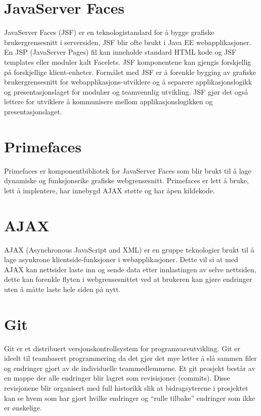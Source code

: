 \documentclass[../main.tex]{subfiles}
\begin{document}
\section{JavaServer Faces}
JavaServer Faces (JSF) er en teknologistandard for å bygge grafiske brukergrensesnitt i serversiden, JSF blir ofte brukt i Java EE webapplikasjoner. En JSP (JavaServer Pages) fil kan inneholde standard HTML kode og JSF templates eller moduler kalt Facelets. JSF komponentene kan gjengis forskjellig på forskjellige klient-enheter. Formålet med JSF er å forenkle bygging av grafiske brukergrensesnitt for webapplikasjons-utviklere og å separere applikasjonslogikk og presentasjonslaget for modulær og teamvennlig utvikling. JSF gjør det også lettere for utviklere å kommunisere mellom applikasjonslogikken og presentasjonslaget. 

\section{Primefaces}
Primefaces er komponentbibliotek for JavaServer Faces som blir brukt til å lage dynamiske og funksjonsrike grafiske webgrensesnitt. Primefaces er lett å bruke, lett å implentere, har innebygd AJAX støtte og har åpen kildekode.

\section{AJAX}
AJAX (Asynchronous JavaScript and XML) er en gruppe teknologier brukt til å lage asynkrone klientside-funksjoner i webapplikasjoner. Dette vil si at med AJAX kan nettsider laste inn og sende data etter innlastingen av selve nettsiden, dette kan forenkle flyten i webgrensesnittet ved at brukeren kan gjøre endringer uten å måtte laste hele siden på nytt. 

\section{Git}
Git er et distribuert versjonskontrollsystem for programvareutvikling. Git er ideelt til teambasert programmering da det gjør det mye letter å slå sammen filer og endringer gjort av de individuelle teammedlemmene. Et git prosjekt består av en mappe der alle endringer blir lagret som revisisjoner (commits). Disse revisjonene blir organisert med full historikk slik at bidragsyterene i prosjektet kan se hvem som har gjort hvilke endringer og “rulle tilbake” endringer som ikke er ønskelige. 

\newpage
\end{document}
